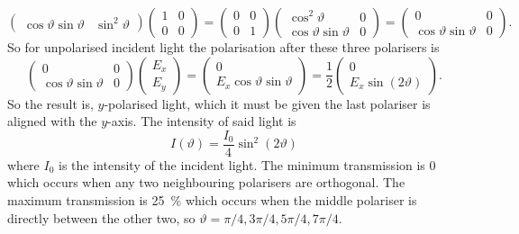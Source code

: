 \begin{example}
\[\begin{pmatrix}
                \cos\vartheta\sin\vartheta & \sin^2\vartheta
            \end{pmatrix}
            \begin{pmatrix}
                1 & 0\\
                0 & 0
            \end{pmatrix}
            =
            \begin{pmatrix}
                0 & 0\\
                0 & 1
            \end{pmatrix}
            \begin{pmatrix}
                \cos^2\vartheta & 0\\
                \cos\vartheta\sin\vartheta & 0
            \end{pmatrix}
            =
            \begin{pmatrix}
                0 & 0\\
                \cos\vartheta\sin\vartheta & 0
            \end{pmatrix}
            .
        \]
        So for unpolarised incident light the polarisation after these three polarisers is
        \[
            \begin{pmatrix}
                0 & 0\\
                \cos\vartheta\sin\vartheta & 0
            \end{pmatrix}
            \begin{pmatrix}
                E_x\\
                E_y
            \end{pmatrix}
            =
            \begin{pmatrix}
                0\\
                E_x\cos\vartheta\sin\vartheta
            \end{pmatrix}
            = \frac{1}{2}
            \begin{pmatrix}
                0\\ E_x\sin(2\vartheta)
            \end{pmatrix}
            .
        \]
        So the result is, \(y\)-polarised light, which it must be given the last polariser is aligned with the \(y\)-axis.
        The intensity of said light is
        \[I(\vartheta) = \frac{I_0}{4}\sin^2(2\vartheta)\]
        where \(I_0\) is the intensity of the incident light.
        The minimum transmission is 0 which occurs when any two neighbouring polarisers are orthogonal.
        The maximum transmission is \SI{25}{\percent} which occurs when the middle polariser is directly between the other two, so \(\vartheta = \pi/4, 3\pi/4, 5\pi/4, 7\pi/4\).
    \end{example}
